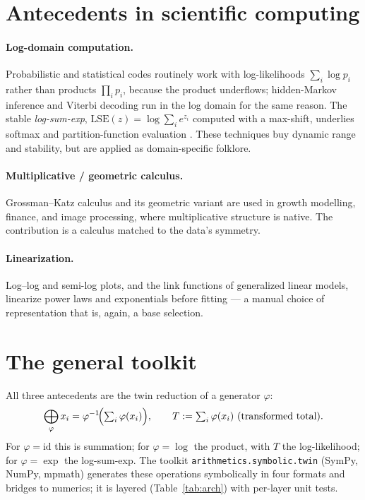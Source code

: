\documentclass[11pt,a4paper]{article}
\newcommand{\code}[1]{\texttt{#1}}
\theoremstyle{definition}
\begin{document}
\section{Antecedents in scientific computing}
\label{sec:prior}

\paragraph{Log-domain computation.} Probabilistic and statistical codes
routinely work with log-likelihoods $\sum_i\log p_i$ rather than products
$\prod_i p_i$, because the product underflows; hidden-Markov inference and
Viterbi decoding run in the log domain for the same reason. The stable
\emph{log-sum-exp}, $\mathrm{LSE}(z)=\log\sum_i e^{z_i}$ computed with a
max-shift, underlies softmax and partition-function evaluation \cite{blanchard}.
These techniques buy dynamic range and stability, but are applied as
domain-specific folklore.

\paragraph{Multiplicative / geometric calculus.} Grossman--Katz calculus
\cite{grossman} and its geometric variant are used in growth modelling, finance,
and image processing, where multiplicative structure is native. The contribution
is a calculus matched to the data's symmetry.

\paragraph{Linearization.} Log--log and semi-log plots, and the link functions
of generalized linear models, linearize power laws and exponentials before
fitting --- a manual choice of representation that is, again, a base selection.

\section{The general toolkit}
\label{sec:toolkit}

All three antecedents are the twin reduction of a generator $\varphi$:
\begin{equation}\label{eq:reduce}
\bigoplus_\varphi x_i=\varphi^{-1}\!\Bigl(\textstyle\sum_i\varphi(x_i)\Bigr),
\qquad T:=\sum_i\varphi(x_i)\ \text{(transformed total).}
\end{equation}
For $\varphi=\mathrm{id}$ this is summation; for $\varphi=\log$ the product, with
$T$ the log-likelihood; for $\varphi=\exp$ the log-sum-exp. The toolkit
\code{arithmetics.symbolic.twin} (SymPy, NumPy, mpmath) generates these
operations symbolically in four formats and bridges to numerics; it is layered
(Table~\ref{tab:arch}) with per-layer unit tests.
\end{document}

